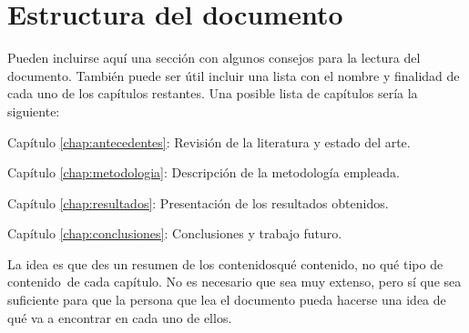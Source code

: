 \section{Estructura del documento}

Pueden incluirse aquí una sección con algunos consejos para la lectura del documento.  También puede ser útil incluir una lista con el nombre y finalidad de cada uno de los capítulos restantes. Una posible lista de capítulos sería la siguiente:

\begin{definitionlist}
\item[Capítulo \ref{chap:antecedentes}: \nameref{chap:antecedentes}] Revisión de la literatura y estado del arte.
\item[Capítulo \ref{chap:metodologia}: \nameref{chap:metodologia}] Descripción de la metodología empleada.
\item[Capítulo \ref{chap:resultados}: \nameref{chap:resultados}] Presentación de los resultados obtenidos.
\item[Capítulo \ref{chap:conclusiones}: \nameref{chap:conclusiones}] Conclusiones y trabajo futuro.
\end{definitionlist}

La idea es que des un resumen de los contenidos\textemdash qué contenido, no qué tipo de contenido\textemdash~de cada capítulo. No es necesario que sea muy extenso, pero sí que sea suficiente para que la persona que lea el documento pueda hacerse una idea de qué va a encontrar en cada uno de ellos.


